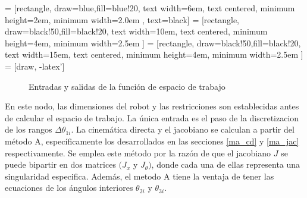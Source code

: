     
         = [rectangle, draw=blue,fill=blue!20, text width=6em, text centered, minimum height=2em, minimum width=2.0em , text=black]
         = [rectangle, draw=black!50,fill=black!20, text width=10em, text centered, minimum height=4em, minimum width=2.5em ]
         = [rectangle, draw=black!50,fill=black!20, text width=15em, text centered, minimum height=4em, minimum width=2.5em ]
         = [draw, -latex']
         \begin{center}
         \begin{figure}[htb]
                \caption{Entradas y salidas de la función de espacio de trabajo}
                \label{f:Cap6_ws_1}
         \end{figure}
         \end{center}
         
        \vspace{-1cm}         
    
    En este nodo, las dimensiones del robot y las restricciones son establecidas antes de calcular el espacio de trabajo. La única entrada es el paso de la discretizacion de los rangos \(  \Delta  \theta _{1i} \). La cinemática directa y el jacobiano se calculan a partir del método A, específicamente los desarrollados en las secciones \eqref{ma_cd} y \eqref{ma_jac} respectivamente. Se emplea este método por la razón de que el jacobiano $J$ se puede bipartir en dos matrices $(J_{x}$  y  $J_{ \theta })$, donde cada una de ellas representa una singularidad especifica. Además, el metodo A tiene la ventaja de tener las ecuaciones de los ángulos interiores $\theta_{2i}$ y $\theta_{3i}$.
    
